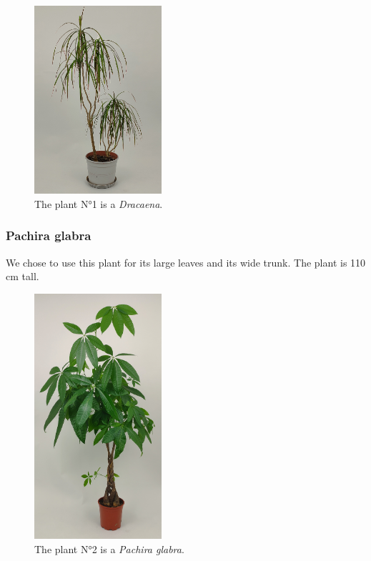 \begin{figure}[ht]
    \centering
    \includegraphics[width=0.42\textwidth, angle=-90]{Images/small_plant.jpg}
    \caption{The plant N°1 is a \textit{Dracaena}.}
    
    \vspace{-0.5cm}
    \label{fig:small_plant}
    \vspace{0.2cm}
\end{figure}




\subsubsection{Pachira glabra}

We chose to use this plant for its large leaves and its wide trunk.
The plant is 110 cm tall.
\begin{figure}[ht]
    \centering
    \includegraphics[width=0.42\textwidth, angle=-90]{Images/tall_plant_cropped.jpg}
    \caption{The plant N°2 is a \textit{Pachira glabra}.}
    
    \vspace{-0.5cm}
    \label{fig:tall_plant}
    \vspace{0.2cm}
\end{figure}


